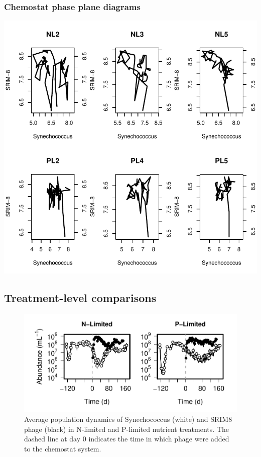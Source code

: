 \documentclass[]{article}
\begin{document}
\newpage

\subsubsection{Chemostat phase plane
diagrams}\label{chemostat-phase-plane-diagrams}

\includegraphics{analysis_ecoevostoich_files/figure-latex/unnamed-chunk-4-1.pdf}
\newpage

\subsection{Treatment-level
comparisons}\label{treatment-level-comparisons}

\begin{figure}[htbp]
\centering
\includegraphics{analysis_ecoevostoich_files/figure-latex/unnamed-chunk-6-1.pdf}
\caption{Average population dynamics of Synechococcus (white) and SRIM8
phage (black) in N-limited and P-limited nutrient treatments. The dashed
line at day 0 indicates the time in which phage were added to the
chemostat system.}
\end{figure}
\end{document}

